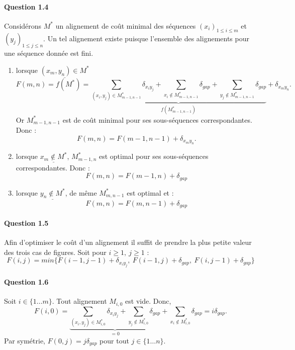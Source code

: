 \paragraph{Question 1.4}
Consid\'erons $M^*$ un alignement de co\^ut minimal des s\'equences
$(x_i)_{1\leq i\leq m}$ et $(y_j)_{1\leq j\leq n}$. Un tel alignement
existe puisque l'ensemble des alignements pour une s\'equence donn\'ee
est fini.
\begin{enumerate}
\item lorsque $\underline{(x_m,y_n)\in M^*}$
  \begin{equation*}
    F(m,n) = f(M^*) = \underbrace{
      \sum_{(x_i,y_j)\in M_{m-1,n-1}^*}\delta_{x_iy_j} +
      \sum_{x_i\not\in M_{m-1,n-1}^*}\delta_{gap} + \sum_{y_j\not\in M_{m-1,n-1}^*}\delta_{gap}}_{f(M_{m-1,n-1}^*)}
    + \delta_{x_my_n}.
  \end{equation*}
  Or $M^*_{m-1,n-1}$ est de co\^ut minimal pour ses sous-s\'equences
  correspondantes. Donc :
  \begin{equation*}
    F(m,n) = F(m-1, n-1) + \delta_{x_my_n}.
  \end{equation*}
\item lorsque $\underline{x_m\not\in M^*}$, $M^*_{m-1,n}$ est optimal pour ses
  sous-s\'equences correspondantes. Donc :
  \begin{equation*}
    F(m,n)=F(m-1,n)+\delta_{gap}
  \end{equation*}
\item lorsque $\underline{y_n\not\in M^*}$, de m\^eme $M^*_{m,n-1}$
  est optimal et :
  \begin{equation*}
    F(m,n)=F(m,n-1)+\delta_{gap}
  \end{equation*}
\end{enumerate}
\paragraph{Question 1.5}
Afin d'optimiser le co\^ut d'un alignement il suffit de prendre la
plus petite valeur des trois cas de figures. Soit pour 
$i\geq 1,\ j\geq 1$ :
\begin{equation*}
  F(i,j)=min\Big\{F(i-1,j-1)+\delta_{x_iy_j},
  \ F(i-1,j)+\delta_{gap},\ F(i,j-1)+\delta_{gap}\Big\}
\end{equation*}
\paragraph{Question 1.6}
Soit $i\in \{1\ldots m\}$. Tout alignement $M_{i,0}$ est vide. Donc,
\begin{equation*}
  F(i,0) = 
  \underbrace{
    \sum_{(x_i,y_j)\in M_{i,0}^*}\delta_{x_iy_j} +
    \sum_{y_j\not\in M_{i,0}^*}\delta_{gap}
  }_{=0} +
  \sum_{x_i\not\in M_{i,0}^*}\delta_{gap}
  = i\delta_{gap}.
\end{equation*}
Par sym\'etrie, $F(0,j)=j\delta_{gap}$ pour tout $j\in\{1\ldots n\}$.
